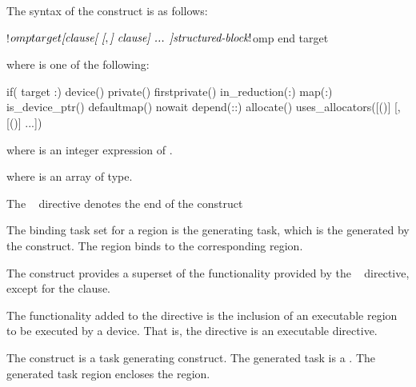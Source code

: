 \begin{samepage}
\smallskip
\begin{fortranspecific}
The syntax of the  construct is as follows:

\begin{ompfPragma}
!$omp target \plc{[clause[ [},\plc{] clause] ... ]}
    \plc{structured-block}
!$omp end target
\end{ompfPragma}

where  is one of the following:

\begin{indentedcodelist}
if(\plc{[} target :\plc{] scalar-logical-expression})
device()
private()
firstprivate()
in_reduction(:)
map(\plc{[[map-type-modifier[,]] map-type}:\plc{ ] list})
is_device_ptr()
defaultmap()
nowait
depend(\plc{[depend-modifier}:\plc{]dependence-type }:)
allocate()
uses_allocators([()]
	       [,[()] ...])
\end{indentedcodelist}

where  is an integer expression of  .

where  is an array of  type.

The ~ directive denotes the end of the  construct
\end{fortranspecific}

\end{samepage}

\binding
The binding task set for a  region is the
generating task, which is the  generated
by the  construct. The 
region binds to the corresponding  region.

\descr
The  construct provides a superset of the functionality
provided by the ~ directive, except for
the  clause.

The functionality added to the  directive is the inclusion of an executable region to be executed by a device. That is, the  directive is an executable directive.

The  construct is a task generating construct.  The generated task is a .  The generated task region encloses the  region.


